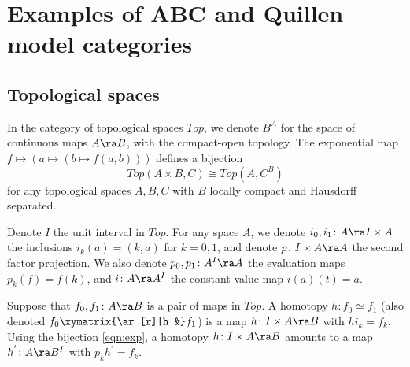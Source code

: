 \chapter{Examples of ABC and Quillen model categories}
\label{chap:examples}

\section{Topological spaces}
\label{sec:exampletopspaces}
In the category of topological spaces $Top$, we denote $B^A$ for the space of continuous maps $A \ra B$, with the compact-open topology. The exponential map $f \mapsto (a \mapsto (b \mapsto f(a, b)))$ defines a bijection
\begin{equation}
\label{eqn:exp}
Top(A \times B, C) \cong Top(A, C^B)
\end{equation}
for any topological spaces $A, B, C$ with $B$ locally compact and Hausdorff separated. 


Denote $I$ the unit interval in $Top$. For any space $A$, we denote $i_0, i_1 \colon A \ra I \times A$ the inclusions $i_k(a) = (k, a)$ for $k = 0, 1$, and denote $p \colon I \times A \ra A$ the second factor projection. We also denote $p_0, p_1 \colon A^I \ra A$ the evaluation maps $p_k(f) = f(k)$, and $i \colon A \ra A^I$ the constant-value map $i(a)(t) = a$. 

\begin{defn}
\label{defn:homotopy}
Suppose that $f_0, f_1 \colon A \ra B$ is a pair of maps in $Top$. A homotopy $h \colon f_0 \simeq f_1$ (also denoted $f_0 \xymatrix{\ar[r]|h &} f_1$) is a map $h \colon I \times A \ra B$ with $hi_k = f_k$. Using the bijection \eqref{eqn:exp}, a homotopy $h \colon I \times A \ra B$ amounts to a map $h^{'} \colon A \ra B^I$ with $p_kh^{'} = f_k$.
\end{defn}

